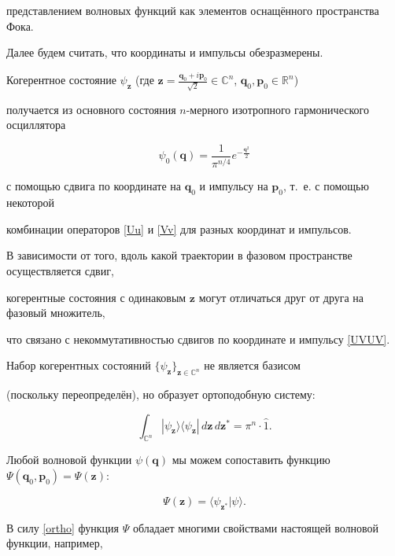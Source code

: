  представлением волновых функций как элементов оснащённого пространства Фока.



 Далее будем считать, что координаты и импульсы обезразмерены.



 Когерентное состояние $\psi_\mathbf{z}$ (где $\mathbf{z}=\frac{\mathbf{q}_0+i\mathbf{p}_0}{\sqrt2}\in\mathbb{C}^n$, $\mathbf{q}_0,\mathbf{p}_0\in\mathbb{R}^n$)

 получается из основного состояния $n$-мерного изотропного гармонического осциллятора

$$

  \psi_0(\mathbf{q})=\frac1{\pi^{n/4}}e^{-\frac{\mathbf{q}^2}2}

$$

 с помощью сдвига по координате на $\mathbf{q}_0$ и импульсу на $\mathbf{p}_0$, т.~е. с помощью некоторой

 комбинации операторов \eqref{Uu} и \eqref{Vv} для разных координат и импульсов.

 В зависимости от того, вдоль какой траектории в фазовом пространстве осуществляется сдвиг,

 когерентные состояния с одинаковым $\mathbf z$ могут отличаться друг от друга на фазовый множитель,

 что связано с некоммутативностью сдвигов по координате и импульсу \eqref{UVUV}.



 Набор когерентных состояний $\{\psi_\mathbf{z}\}_{\mathbf{z}\in\mathbb{C}^n}$ не является базисом

 (поскольку переопределён), но образует ортоподобную систему:

\begin{equation}\label{ortho}

\int_{\mathbb{C}^n}|\psi_\mathbf{z}\rangle\langle\psi_\mathbf{z}|\,d\mathbf{z}\,d\mathbf{z}^*

=\pi^n\cdot\hat 1.

\end{equation}

 Любой волновой функции $\psi(\mathbf{q})$ мы можем сопоставить функцию $\Psi(\mathbf{q}_0,\mathbf{p}_0)=\Psi(\mathbf{z})$:

$$

  \Psi(\mathbf{z})=\langle\psi_{\mathbf{z}^*}|\psi\rangle.

$$

 В силу \eqref{ortho} функция $\Psi$ обладает многими свойствами настоящей волновой функции, например,


